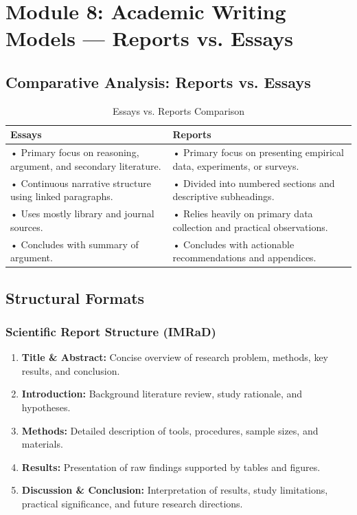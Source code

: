 \documentclass[11pt, a4paper]{article}
\begin{document}
\newpage

\section{Module 8: Academic Writing Models --- Reports vs. Essays}

\subsection{Comparative Analysis: Reports vs. Essays}
\begin{table}[htbp]
\centering
\small
\caption{Essays vs. Reports Comparison}
\begin{tabular}{p{7.5cm}p{7.5cm}}
\toprule
\textbf{Essays} & \textbf{Reports} \\
\midrule
• Primary focus on reasoning, argument, and secondary literature. & • Primary focus on presenting empirical data, experiments, or surveys. \\
• Continuous narrative structure using linked paragraphs. & • Divided into numbered sections and descriptive subheadings. \\
• Uses mostly library and journal sources. & • Relies heavily on primary data collection and practical observations. \\
• Concludes with summary of argument. & • Concludes with actionable recommendations and appendices. \\
\bottomrule
\end{tabular}
\end{table}

\subsection{Structural Formats}

\subsubsection{Scientific Report Structure (IMRaD)}
\begin{enumerate}
    \item \textbf{Title \& Abstract:} Concise overview of research problem, methods, key results, and conclusion.
    \item \textbf{Introduction:} Background literature review, study rationale, and hypotheses.
    \item \textbf{Methods:} Detailed description of tools, procedures, sample sizes, and materials.
    \item \textbf{Results:} Presentation of raw findings supported by tables and figures.
    \item \textbf{Discussion \& Conclusion:} Interpretation of results, study limitations, practical significance, and future research directions.
\end{enumerate}
\end{document}
